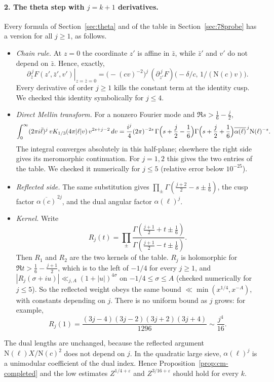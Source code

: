 \documentclass[11pt]{article}
\numberwithin{equation}{section}
\newcommand{\N}{\mathrm N}
\begin{document}
\paragraph{2. The theta step with $j=k+1$ derivatives.} Every formula of Section~\ref{sec:theta} and of the
table in Section~\ref{sec:78probe} has a version for all $j\ge1$, as follows.
\begin{itemize}
\item \emph{Chain rule.} At $z=0$ the coordinate $z'$ is affine in $\bar z$, while $\bar z'$ and $v'$ do not
 depend on $\bar z$. Hence, exactly,
 \begin{equation}\label{eq:d090}
  \left.\partial_{\bar z}^{\,j}F(z',\bar z',v')\right|_{z=\bar z=0}
  =\bigl(-(cv)^{-2}\bigr)^{j}\,(\partial_{z'}^{\,j}F)\bigl(-\delta/c,\,1/(\N(c)v)\bigr).
 \end{equation}
 Every derivative of order $j\ge1$ kills the constant term at the identity cusp. We checked this
 identity symbolically for $j\le4$.
\item \emph{Direct Mellin transform.} For a nonzero Fourier mode and $\Re s>\frac16-\frac j2$,
 \begin{equation}\label{eq:d091}
  \int_0^\infty(2\pi i\bar\ell)^j\,vK_{1/3}(4\pi|\ell|v)\,v^{2s+j-2}\,dv
  =\frac{i^j}4(2\pi)^{-2s}\,\Gamma\Bigl(s+\frac j2-\frac16\Bigr)\Gamma\Bigl(s+\frac j2+\frac16\Bigr)
   \overline{\alpha(\ell)}^{\,j}\N(\ell)^{-s}.
 \end{equation}
 The integral converges absolutely in this half-plane; elsewhere the right side gives its
 meromorphic continuation. For $j=1,2$ this gives the two entries of the table. We checked it numerically for $j\le5$ (relative
 error below $10^{-25}$).
\item \emph{Reflected side.} The same substitution gives $\prod_\pm\Gamma(\frac{j+2}2-s\pm\frac16)$, the cusp
 factor $\overline{\alpha(c)}^{\,2j}$, and the dual angular factor $\alpha(\ell)^j$.
\item \emph{Kernel.} Write
 \begin{equation}\label{eq:d092}
  R_j(t)=\prod_\pm\frac{\Gamma(\frac{j+1}2+t\pm\frac16)}{\Gamma(\frac{j+1}2-t\pm\frac16)} .
 \end{equation}
 Then $R_1$ and $R_2$ are the two kernels of the table. $R_j$ is holomorphic for
 $\Re t>\frac16-\frac{j+1}2$, which is to the left of $-1/4$ for every $j\ge1$, and
 $|R_j(\sigma+iu)|\ll_{j,A}(1+|u|)^{4\sigma}$ on $-1/4\le\sigma\le A$ (checked numerically for $j\le5$). So the
 reflected weight obeys the same bound $\ll\min(x^{1/4},x^{-A})$, with constants depending on $j$.
 There is no uniform bound as $j$ grows: for example,
 \begin{equation}\label{eq:d093}
  R_j(1)=\frac{(3j-4)(3j-2)(3j+2)(3j+4)}{1296}\sim\frac{j^4}{16}.
 \end{equation}
\end{itemize}
The dual lengths are unchanged, because the reflected argument $\N(\ell)X/\N(c)^2$ does not depend on
$j$. In the quadratic large sieve, $\alpha(\ell)^j$ is a unimodular coefficient of the dual index. Hence
Proposition~\ref{prop:cm-completed} and the low estimates $Z^{1/4+\varepsilon}$ and $Z^{3/16+\varepsilon}$ should hold
for every $k$.
\end{document}

